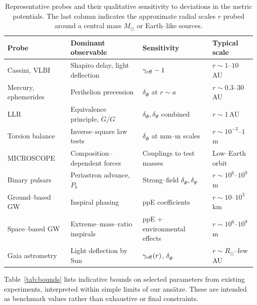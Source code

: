 \documentclass[11pt,a4paper]{article}
\begin{document}
\begin{table}[htbp]
\centering
\begin{tabularx}{\textwidth}{@{}l Y Y l@{}}
\toprule
Probe & Dominant observable & Sensitivity & Typical scale \\ \midrule
Cassini, VLBI & Shapiro delay, light deflection & $\gamma_{\rm eff} - 1$ & $r\sim 1$--$10$\,AU \\
Mercury, ephemerides & Perihelion precession & $\delta_\Phi$ at $r\sim a$ & $r\sim 0.3$--$30$\,AU \\
LLR & Equivalence principle, $\dot{G}/G$ & $\delta_\Phi,\delta_\Psi$ combined & $r\sim 1$\,AU \\
Torsion balance & Inverse--square law tests & $\delta_\Phi$ at mm--m scales & $r\sim 10^{-3}$--$1$\,m \\
MICROSCOPE & Composition--dependent forces & Couplings to test masses & Low--Earth orbit \\
Binary pulsars & Periastron advance, $\dot{P}_b$ & Strong--field $\delta_\Phi,\delta_\Psi$ & $r\sim 10^6$--$10^9$\,m \\
Ground--based GW & Inspiral phasing & ppE coefficients & $r\sim 10$--$10^3$\,km \\
Space--based GW & Extreme--mass--ratio inspirals & ppE + environmental effects & $r\sim 10^6$--$10^9$\,m \\
Gaia astrometry & Light deflection by Sun & $\gamma_{\rm eff}(r)$, $\delta_\Phi$ & $r\sim R_\odot$--few AU \\ \bottomrule
\end{tabularx}
\caption{Representative probes and their qualitative sensitivity to deviations in the metric potentials. The last column indicates the approximate radial scales $r$ probed around a central mass $M_\odot$ or Earth--like sources.}
\label{tab:probes}
\end{table}

Table~\ref{tab:bounds} lists indicative bounds on selected parameters from existing experiments, interpreted within simple limits of our ans\"atze. These are intended as benchmark values rather than exhaustive or final constraints.
\end{document}
